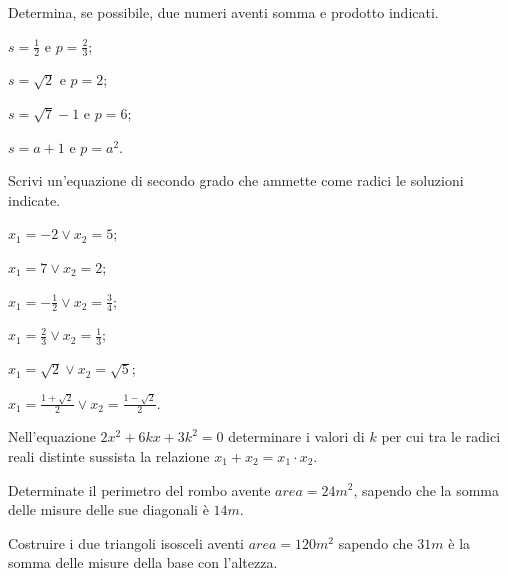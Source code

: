 \begin{esercizio}
 \label{ese:3.78}
Determina, se possibile, due numeri aventi somma e prodotto indicati.
\begin{multicols}{2}
\begin{enumeratea}
\item $s = \frac{1}{2} \text{ e } p = \frac{2}{3}$;
\item $s = \sqrt{2} \text{ e } p = 2$;
\item $s = \sqrt{7}-1 \text{ e } p = 6$;
\item $s = a + 1 \text{ e } p= a^{2}$.
\end{enumeratea}
\end{multicols}
\end{esercizio}

\begin{esercizio}
 \label{ese:3.79}
Scrivi un'equazione di secondo grado che ammette come radici le soluzioni indicate.
\begin{multicols}{2}
\begin{enumeratea}
\item $x_{1} =-2 \vee x_{2} = 5$;
\item $x_{1} = 7 \vee x_{2} = 2$;
\item $x_{1} =-\frac{1}{2} \vee x_{2} = \frac{3}{4}$;
\item $x_{1} = \frac{2}{3} \vee x_{2} = \frac{1}{3}$;
\item $x_{1} = \sqrt{2} \vee x_{2} = \sqrt{5}$;
\item $x_{1} = \frac{1 + \sqrt{2}}{2} \vee x_{2} = \frac{1-\sqrt{2}}{2}$.
\end{enumeratea}
\end{multicols}
\end{esercizio}

\begin{esercizio}
 \label{ese:3.80}
Nell'equazione $2 x^{2} + 6 k x + 3 k^{2} = 0$ determinare i valori di $k$ per cui tra le radici reali distinte sussista la relazione $x_{1} + x_{2} = x_{1} \cdot x_{2}$.
\end{esercizio}

\begin{esercizio}
 \label{ese:3.81}
Determinate il perimetro del rombo avente $area = 24\unit{m^{2}}$, sapendo che la somma delle misure delle sue diagonali è $14\unit{m}$.
\end{esercizio}

\begin{esercizio}
\label{ese:3.82}
Costruire i due triangoli isosceli aventi $area = 120\unit{m^{2}}$ sapendo che $31\unit{m}$ è la somma delle misure della base con l’altezza.
\end{esercizio}

